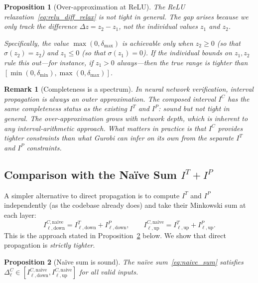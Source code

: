 \documentclass[11pt]{article}
\newcommand{\layerl}{\ell}
\newtheorem{proposition}{Proposition}
\newtheorem{remark}{Remark}
\begin{document}
\begin{proposition}[Over-approximation at ReLU]
\label{prop:relu_overapprox}
The ReLU relaxation~\eqref{eq:relu_diff_relax} is \emph{not tight} in general.
The gap arises because we only track the \emph{difference}
$\Delta z = z_2 - z_1$, not the individual values $z_1$ and $z_2$.

Specifically, the value $\max(0, \delta_{\max})$ is achievable only when
$z_2 \ge 0$ (so that $\sigma(z_2) = z_2$) and $z_1 \le 0$ (so that
$\sigma(z_1) = 0$). If the individual bounds on $z_1, z_2$ rule this out---for
instance, if $z_1 > 0$ always---then the true range is tighter than
$[\min(0,\delta_{\min}), \max(0,\delta_{\max})]$.
\end{proposition}

\begin{remark}[Completeness is a spectrum]
In neural network verification, interval propagation is always an
\emph{outer approximation}. The composed interval $I^C$ has the same
completeness status as the existing $I^T$ and $I^P$: sound but not tight
in general. The over-approximation grows with network depth, which is
inherent to any interval-arithmetic approach. What matters in practice is
that $I^C$ provides tighter constraints than what Gurobi can infer
on its own from the separate $I^T$ and $I^P$ constraints.
\end{remark}

\subsection{Comparison with the Na\"ive Sum $I^T + I^P$}
\label{sec:composed:comparison}

A simpler alternative to direct propagation is to compute $I^T$ and $I^P$
independently (as the codebase already does) and take their Minkowski sum
at each layer:
\begin{equation}
    I^{C,\text{naive}}_{\layerl,\text{down}} = I^T_{\layerl,\text{down}} + I^P_{\layerl,\text{down}},
    \qquad
    I^{C,\text{naive}}_{\layerl,\text{up}} = I^T_{\layerl,\text{up}} + I^P_{\layerl,\text{up}}.
    \label{eq:naive_sum}
\end{equation}
This is the approach stated in Proposition~\ref{prop:composed_naive} below.
We show that direct propagation is \emph{strictly tighter}.

\begin{proposition}[Na\"ive sum is sound]
\label{prop:composed_naive}
The na\"ive sum~\eqref{eq:naive_sum} satisfies
$\Delta^C_\layerl \in [I^{C,\text{naive}}_{\layerl,\text{down}}, I^{C,\text{naive}}_{\layerl,\text{up}}]$
for all valid inputs.
\end{proposition}
\end{document}
